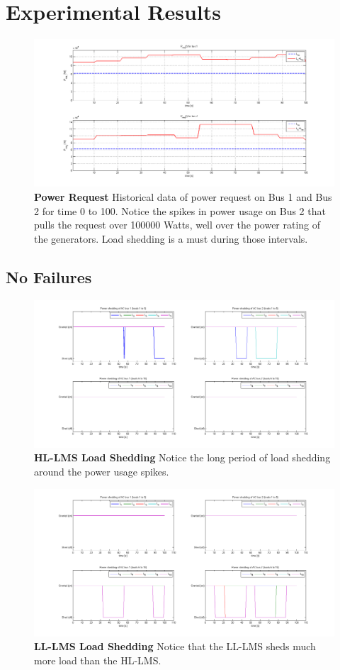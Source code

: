\documentclass{acm_proc_article-sp}
\begin{document}
\section{Experimental Results}
\begin{figure}[hb]
  \centering
  \includegraphics[width=0.9\columnwidth]{figures/preqnofail.png}
  \caption{\textbf{Power Request}
  Historical data of power request on Bus 1 and Bus 2 for time 0
  to 100. Notice the spikes in power usage on Bus 2 that pulls the
  request over 100000 Watts, well over the power rating of the generators.
  Load shedding is a must during those intervals.}
  \label{fig:preqnofail}
\end{figure}

\subsection{No Failures}
\begin{figure}[ht]
  \centering
  \includegraphics[width=0.9\columnwidth]{figures/lshlnofail.png}
  \caption{\textbf{HL-LMS Load Shedding} Notice the long
  period of load shedding around the power usage spikes.}
  \label{fig:lshlnofail}
\end{figure}
\begin{figure}[ht]
  \centering
  \includegraphics[width=0.9\columnwidth]{figures/lsllnofail.png}
  \caption{\textbf{LL-LMS Load Shedding} Notice that the 
  LL-LMS sheds much more load than the HL-LMS.}
  \label{fig:lsllnofail}
\end{figure}
\end{document}
